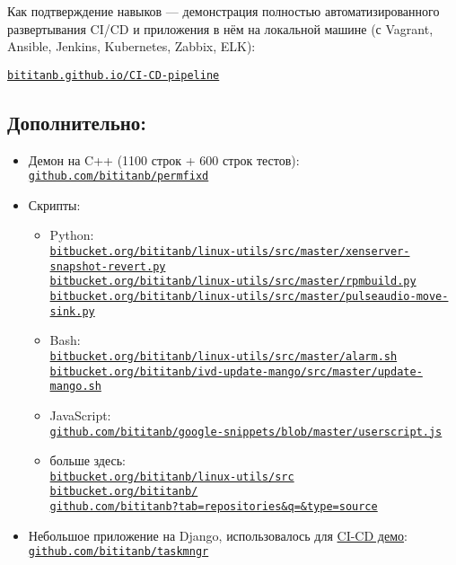 \documentclass[11pt, a4paper]{article}
\newcommand\rurl[1]{%
  \href{http://#1}{\nolinkurl{#1}}%
}
\begin{document}
Как подтверждение навыков — демонстрация полностью автоматизированного развертывания CI/CD и приложения в нём на локальной машине (с Vagrant, Ansible, Jenkins, Kubernetes, Zabbix, ELK):

\rurl{bititanb.github.io/CI-CD-pipeline}

\subsection*{Дополнительно:}
\begin{itemize}
  \item Демон на C++ (1100 строк + 600 строк тестов):\\
    \rurl{github.com/bititanb/permfixd}
  \item Скрипты:
    \begin{itemize}
      \item Python:\\
        \rurl{bitbucket.org/bititanb/linux-utils/src/master/xenserver-snapshot-revert.py}\\
        \rurl{bitbucket.org/bititanb/linux-utils/src/master/rpmbuild.py}\\
        \rurl{bitbucket.org/bititanb/linux-utils/src/master/pulseaudio-move-sink.py}
      \item Bash:\\
        \rurl{bitbucket.org/bititanb/linux-utils/src/master/alarm.sh}\\
        \rurl{bitbucket.org/bititanb/ivd-update-mango/src/master/update-mango.sh}
      \item JavaScript:\\
        \rurl{github.com/bititanb/google-snippets/blob/master/userscript.js}
      \item больше здесь:\\
        \rurl{bitbucket.org/bititanb/linux-utils/src}\\
        \rurl{bitbucket.org/bititanb/}\\
        \rurl{github.com/bititanb?tab=repositories&q=&type=source}
    \end{itemize}
  \item Небольшое приложение на Django, использовалось для \href{https://github.com/bititanb/CI-CD-pipeline}{CI-CD демо}:\\
    \rurl{github.com/bititanb/taskmngr}
\end{itemize}
\end{document}
